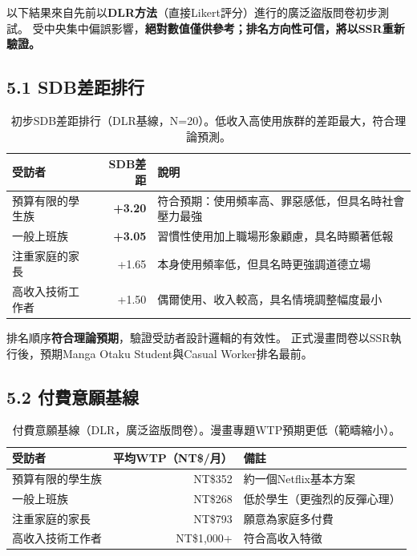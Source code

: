 \documentclass[12pt, a4paper]{article}
\begin{document}
\begin{tcolorbox}[colback=yellow!10, colframe=orange!50, boxrule=0.5pt]
以下結果來自先前以\textbf{DLR方法}（直接Likert評分）進行的廣泛盜版問卷初步測試。
受中央集中偏誤影響，\textbf{絕對數值僅供參考；排名方向性可信，將以SSR重新驗證。}
\end{tcolorbox}

\subsection{5.1 SDB差距排行}

\begin{table}[H]
\centering\small
\begin{tabular}{lrp{8cm}}
\toprule
\textbf{受訪者} & \textbf{SDB差距} & \textbf{說明} \\
\midrule
預算有限的學生族 & \textcolor{red!70!black}{\textbf{+3.20}} & 符合預期：使用頻率高、罪惡感低，但具名時社會壓力最強 \\
一般上班族 & \textcolor{red!70!black}{\textbf{+3.05}} & 習慣性使用加上職場形象顧慮，具名時顯著低報 \\
注重家庭的家長 & +1.65 & 本身使用頻率低，但具名時更強調道德立場 \\
高收入技術工作者 & +1.50 & 偶爾使用、收入較高，具名情境調整幅度最小 \\
\bottomrule
\end{tabular}
\caption{初步SDB差距排行（DLR基線，N=20）。低收入高使用族群的差距最大，符合理論預測。}
\end{table}

排名順序\textbf{符合理論預期}，驗證受訪者設計邏輯的有效性。
正式漫畫問卷以SSR執行後，預期Manga Otaku Student與Casual Worker排名最前。

\subsection{5.2 付費意願基線}

\begin{table}[H]
\centering\small
\begin{tabular}{lrp{6cm}}
\toprule
\textbf{受訪者} & \textbf{平均WTP（NT\$/月）} & \textbf{備註} \\
\midrule
預算有限的學生族 & NT\$352 & 約一個Netflix基本方案 \\
一般上班族 & NT\$268 & 低於學生（更強烈的反彈心理） \\
注重家庭的家長 & NT\$793 & 願意為家庭多付費 \\
高收入技術工作者 & NT\$1,000+ & 符合高收入特徵 \\
\bottomrule
\end{tabular}
\caption{付費意願基線（DLR，廣泛盜版問卷）。漫畫專題WTP預期更低（範疇縮小）。}
\end{table}
\end{document}
